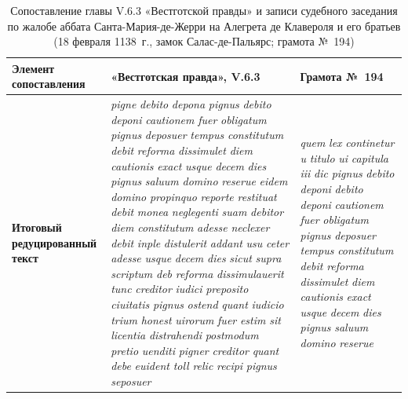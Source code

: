 \begin{center}
\small
\setlength{\tabcolsep}{2pt}
\begin{longtable}{|p{}|p{}|p{}|}
\caption{Сопоставление главы V.6.3 «Вестготской правды» и записи судебного заседания по жалобе аббата Санта-Мария-де-Жерри на Алегрета де Клавероля и его братьев (18 февраля 1138~г., замок Салас-де-Пальярс; грамота №~194)}\label{tab:volume1-last}\\
\hline
\textbf{Элемент сопоставления} & \textbf{«Вестготская правда», V.6.3} & \textbf{Грамота}\textbf{ №~194} \\ \hline
\textbf{Итоговый редуцированный текст} & \emph{pigne}\emph{ }\emph{debito}\emph{ }\emph{depona}\emph{ }\emph{pignus}\emph{ }\emph{debito}\emph{ }\emph{deponi}\emph{ }\emph{cautionem}\emph{ }\emph{fuer}\emph{ }\emph{obligatum}\emph{ }\emph{pignus}\emph{ }\emph{deposuer}\emph{ }\emph{tempus}\emph{ }\emph{constitutum}\emph{ }\emph{debit}\emph{ }\emph{reforma}\emph{ }\emph{dissimulet}\emph{ }\emph{diem}\emph{ }\emph{cautionis}\emph{ }\emph{exact}\emph{ }\emph{usque}\emph{ }\emph{decem}\emph{ }\emph{dies}\emph{ }\emph{pignus}\emph{ }\emph{saluum}\emph{ }\emph{domino}\emph{ }\emph{reserue}\emph{ }\emph{eidem}\emph{ }\emph{domino}\emph{ }\emph{propinquo}\emph{ }\emph{reporte}\emph{ }\emph{restituat}\emph{ }\emph{debit}\emph{ }\emph{monea}\emph{ }\emph{neglegenti}\emph{ }\emph{suam}\emph{ }\emph{debitor}\emph{ }\emph{diem}\emph{ }\emph{constitutum}\emph{ }\emph{adesse}\emph{ }\emph{neclexer}\emph{ }\emph{debit}\emph{ }\emph{inple}\emph{ }\emph{distulerit}\emph{ }\emph{addant}\emph{ }\emph{usu}\emph{ }\emph{ceter}\emph{ }\emph{adesse}\emph{ }\emph{usque}\emph{ }\emph{decem}\emph{ }\emph{dies}\emph{ }\emph{sicut}\emph{ }\emph{supra}\emph{ }\emph{scriptum}\emph{ }\emph{deb}\emph{ }\emph{reforma}\emph{ }\emph{dissimulauerit}\emph{ }\emph{tunc}\emph{ }\emph{creditor}\emph{ }\emph{iudici}\emph{ }\emph{preposito}\emph{ }\emph{ciuitatis}\emph{ }\emph{pignus}\emph{ }\emph{ostend}\emph{ }\emph{quant}\emph{ }\emph{iudicio}\emph{ }\emph{trium}\emph{ }\emph{honest}\emph{ }\emph{uirorum}\emph{ }\emph{fuer}\emph{ }\emph{estim}\emph{ }\emph{sit}\emph{ }\emph{licentia}\emph{ }\emph{distrahendi}\emph{ }\emph{postmodum}\emph{ }\emph{pretio}\emph{ }\emph{uenditi}\emph{ }\emph{pigner}\emph{ }\emph{creditor}\emph{ }\emph{quant}\emph{ }\emph{debe}\emph{ }\emph{euident}\emph{ }\emph{toll}\emph{ }\emph{relic}\emph{ }\emph{recipi}\emph{ }\emph{pignus}\emph{ }\emph{seposuer} & \emph{quem}\emph{ }\emph{lex}\emph{ }\emph{continetur}\emph{ u }\emph{titulo}\emph{ }\emph{ui}\emph{ }\emph{capitula}\emph{ }\emph{iii}\emph{ }\emph{dic}\emph{ }\emph{pignus}\emph{ }\emph{debito}\emph{ }\emph{deponi}\emph{ }\emph{debito}\emph{ }\emph{deponi}\emph{ }\emph{cautionem}\emph{ }\emph{fuer}\emph{ }\emph{obligatum}\emph{ }\emph{pignus}\emph{ }\emph{deposuer}\emph{ }\emph{tempus}\emph{ }\emph{constitutum}\emph{ }\emph{debit}\emph{ }\emph{reforma}\emph{ }\emph{dissimulet}\emph{ }\emph{diem}\emph{ }\emph{cautionis}\emph{ }\emph{exact}\emph{ }\emph{usque}\emph{ }\emph{decem}\emph{ }\emph{dies}\emph{ }\emph{pignus}\emph{ }\emph{saluum}\emph{ }\emph{domino}\emph{ }\emph{reserue}\emph{ 
\end{longtable}
\end{center}
